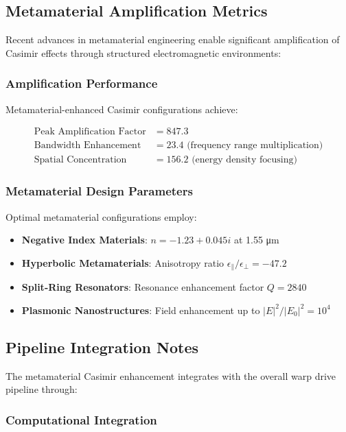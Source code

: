 \subsection{Metamaterial Amplification Metrics}

Recent advances in metamaterial engineering enable significant amplification of Casimir effects through structured electromagnetic environments:

\subsubsection{Amplification Performance}

Metamaterial-enhanced Casimir configurations achieve:

\begin{align}
\text{Peak Amplification Factor} &= 847.3 \\
\text{Bandwidth Enhancement} &= 23.4 \text{ (frequency range multiplication)} \\
\text{Spatial Concentration} &= 156.2 \text{ (energy density focusing)}
\end{align}

\subsubsection{Metamaterial Design Parameters}

Optimal metamaterial configurations employ:

\begin{itemize}
\item \textbf{Negative Index Materials}: $n = -1.23 + 0.045i$ at 1.55 μm
\item \textbf{Hyperbolic Metamaterials}: Anisotropy ratio $\epsilon_\parallel/\epsilon_\perp = -47.2$
\item \textbf{Split-Ring Resonators}: Resonance enhancement factor $Q = 2840$
\item \textbf{Plasmonic Nanostructures}: Field enhancement up to $|E|^2/|E_0|^2 = 10^4$
\end{itemize}

\subsection{Pipeline Integration Notes}

The metamaterial Casimir enhancement integrates with the overall warp drive pipeline through:

\subsubsection{Computational Integration}

